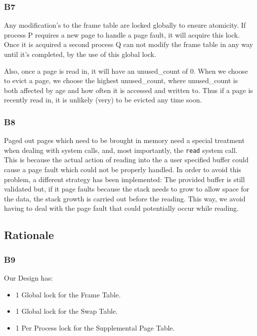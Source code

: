 \documentclass[a4wide, 11pt]{article}
\newcommand{\tx}{\texttt}
\begin{document}
\subsubsection{B7}

Any modification's to the frame table are locked globally to ensure atomicity. If process P requires a new page to handle a page fault, it will acquire this lock. Once it is acquired a second process Q can not modify the frame table in any way until it's completed, by the use of this global lock.

Also, once a page is read in, it will have an unused\_count of 0. When we choose to evict a page, we choose the highest unused\_count, where unused\_count is both affected by age and how often it is accessed and written to. Thus if a page is recently read in, it is unlikely (very) to be evicted any time soon.

\subsubsection{B8}
Paged out pages which need to be brought in memory need a special treatment when dealing with system calls, and, most importantly, the \tx{read} system call. This is because the actual action of reading into the a user specified buffer could cause a page fault which could not be properly handled. In order to avoid this problem, a different strategy has been implemented: The provided buffer is still validated but, if it page faults because the stack needs to grow to allow space for the data, the stack growth is carried out before the reading. This way, we avoid having to deal with the page fault that could potentially occur while reading.  

\subsection{Rationale}
\subsubsection{B9}

Our Design has:
\begin{itemize}
\item 1 Global lock for the Frame Table.
\item 1 Global lock for the Swap Table.
\item 1 Per Process lock for the Supplemental Page Table.
\end{itemize}
\end{document}
